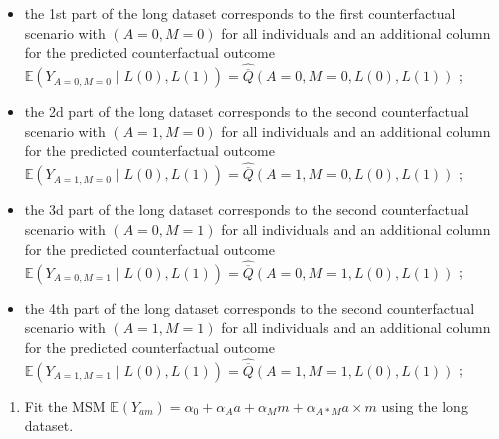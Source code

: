 \documentclass[
]{book}
\providecommand{\tightlist}{%
  \setlength{\itemsep}{0pt}\setlength{\parskip}{0pt}}
\begin{document}
\begin{itemize}
\tightlist
\item
  the 1st part of the long dataset corresponds to the first counterfactual scenario with \((A=0,M=0)\) for all individuals and an additional column for the predicted counterfactual outcome \(\mathbb{E}(Y_{A=0,M=0}\mid L(0),L(1)) = \hat{\overline{Q}}(A=0,M=0,L(0),L(1))\) ;
\item
  the 2d part of the long dataset corresponds to the second counterfactual scenario with \((A=1,M=0)\) for all individuals and an additional column for the predicted counterfactual outcome \(\mathbb{E}(Y_{A=1,M=0}\mid L(0),L(1)) = \hat{\overline{Q}}(A=1,M=0,L(0),L(1))\) ;
\item
  the 3d part of the long dataset corresponds to the second counterfactual scenario with \((A=0,M=1)\) for all individuals and an additional column for the predicted counterfactual outcome \(\mathbb{E}(Y_{A=0,M=1}\mid L(0),L(1)) = \hat{\overline{Q}}(A=0,M=1,L(0),L(1))\) ;
\item
  the 4th part of the long dataset corresponds to the second counterfactual scenario with \((A=1,M=1)\) for all individuals and an additional column for the predicted counterfactual outcome \(\mathbb{E}(Y_{A=1,M=1}\mid L(0),L(1)) = \hat{\overline{Q}}(A=1,M=1,L(0),L(1))\) ;
\end{itemize}

\begin{enumerate}
\def\labelenumi{\arabic{enumi}.}
\setcounter{enumi}{3}
\tightlist
\item
  Fit the MSM \(\mathbb{E}(Y_{am}) = \alpha_0 + \alpha_A a + \alpha_M m + \alpha_{A \ast M} a \times m\) using the long dataset.
\end{enumerate}
\end{document}
